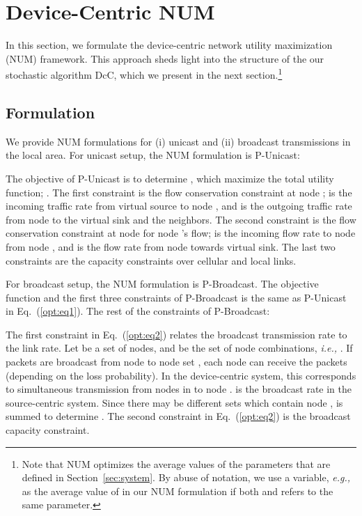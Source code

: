 \documentclass[conference]{IEEEtran}
\newcommand{\ie}{{\em i.e., }}
\newcommand{\eg}{{\em e.g., }}
\begin{document}
\section{\label{sec:NUM} Device-Centric NUM}
In this section, we formulate the device-centric network utility maximization (NUM) framework. This approach sheds light into the structure of the our stochastic algorithm DcC, which we present in the next section.\footnote{Note that NUM optimizes the average values of the parameters that are defined in Section~\ref{sec:system}. By abuse of notation, we use a variable, \eg  as the average value of   in our NUM formulation if both  and  refers to the same parameter.}

\subsection{\label{sec:NUM_Formulation} Formulation}
We provide NUM formulations for (i) unicast and (ii) broadcast transmissions in the local area. For unicast setup, the NUM formulation is P-Unicast:

The objective of P-Unicast is to determine  ,   which maximize the total utility function; .
The first constraint is the flow conservation constraint at node ;  is the incoming traffic rate from virtual source to node , and  is the outgoing traffic rate from node  to the virtual sink and the neighbors. The second constraint is the flow conservation constraint at node  for node 's flow;  is the incoming flow rate to node  from node , and  is the flow rate from node  towards virtual sink. The last two constraints are the capacity constraints over cellular and local links.


For broadcast setup, the NUM formulation is P-Broadcast. The objective function and the first three constraints of P-Broadcast is the same as P-Unicast in Eq.~(\ref{opt:eq1}). The rest of the constraints of P-Broadcast:

The first constraint in Eq.~(\ref{opt:eq2}) relates the broadcast transmission rate to the link rate. Let  be a set of nodes, and  be the set of node combinations, \ie . If packets are broadcast from node  to node set , each node  can receive the packets (depending on the loss probability). In the device-centric system, this corresponds to simultaneous transmission from nodes in  to node .   is the broadcast rate in the source-centric system. Since there may be different  sets which contain node ,  is summed  to determine . The second constraint in Eq.~(\ref{opt:eq2}) is the broadcast capacity constraint.
\end{document}
